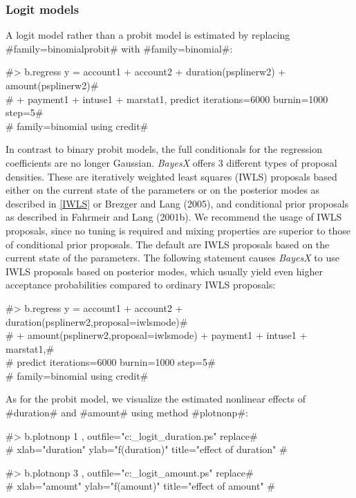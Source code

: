 \clearpage

\subsubsection{Logit models}

A logit model rather than a probit model is estimated by replacing
#family=binomialprobit# with #family=binomial#:

#> b.regress  y = account1 + account2 + duration(psplinerw2) + amount(psplinerw2)# \\
#  + payment1 + intuse1 + marstat1, predict iterations=6000 burnin=1000 step=5# \\
#  family=binomial using credit#

In contrast to binary probit models, the full conditionals for the
regression coefficients are no longer Gaussian. {\em BayesX} offers
3 different types of proposal densities. These are iteratively
weighted least squares (IWLS) proposals based either on the current
state of the parameters or on the posterior modes as described in
\autoref{IWLS} or Brezger and Lang (2005), and conditional prior
proposals as described in Fahrmeir and Lang (2001b). We recommend
the usage of IWLS proposals, since no tuning is required and mixing
properties are superior to those of conditional prior proposals. The
default are IWLS proposals based on the current state of the
parameters. The following statement causes {\em BayesX} to use IWLS
proposals based on posterior modes, which usually yield even higher
acceptance probabilities compared to ordinary IWLS proposals:

#> b.regress  y = account1 + account2 + duration(psplinerw2,proposal=iwlsmode)# \\
#  + amount(psplinerw2,proposal=iwlsmode) + payment1 + intuse1 + marstat1,# \\
#  predict iterations=6000 burnin=1000 step=5# \\
#  family=binomial using credit#

As for the probit model, we visualize the estimated nonlinear
effects of #duration# and #amount# using method #plotnonp#:

#> b.plotnonp 1 , outfile="c:\results\credit_logit_duration.ps" replace# \\
#  xlab="duration" ylab="f(duration)" title="effect of duration" #

#> b.plotnonp 3 , outfile="c:\results\credit_logit_amount.ps" replace# \\
#  xlab="amount" ylab="f(amount)" title="effect of amount" #

